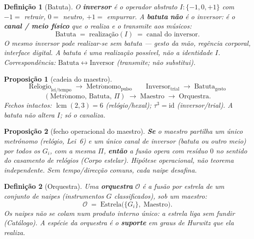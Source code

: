 \documentclass[11pt,a4paper]{article}
\newtheorem{definicao}{Definição}
\newtheorem{proposicao}{Proposição}
\begin{document}
\begin{definicao}[Batuta]\label{def:batuta}
O \textbf{inversor} é o operador abstrato $I\colon\{-1,0,+1\}$ com
$-1=$ retrair, $0=$ neutro, $+1=$ empurrar.
A \textbf{batuta} \textbf{não} é o inversor: é o
\textbf{canal / meio físico} que o realiza e o transmite aos músicos:
\[
\boxed{
\mathrm{Batuta}
\;=\;
\text{realização}(I)
\;=\;
\text{canal do inversor}.
}
\]
O mesmo inversor pode realizar-se sem batuta --- gesto da mão,
regência corporal, interface digital. A batuta é \emph{uma} realização
possível, não a identidade $I$. Correspondência:
$\mathrm{Batuta}\leftrightarrow\mathrm{Inversor}$ (transmite; não
substitui).
\end{definicao}

\begin{proposicao}[cadeia do maestro]\label{prop:batuta-metro}
\[
\boxed{
\mathrm{Rel\acute{o}gio}_{\mathrm{lei/tempo}}
\;\rightarrow\;
\mathrm{Metr\acute{o}nomo}_{\mathrm{pulso}}
}
\qquad
\boxed{
\mathrm{Inversor}_{\mathrm{trial}}
\;\rightarrow\;
\mathrm{Batuta}_{\mathrm{gesto}}
}
\]
\[
\boxed{
(\mathrm{Metr\acute{o}nomo},\,\mathrm{Batuta},\,\Pi)
\;\rightarrow\;
\mathrm{Maestro}
\;\rightarrow\;
\mathrm{Orquestra}.
}
\]
Fechos intactos: $\operatorname{lcm}(2,3)=6$ (relógio/hexal);
$\tau^{3}=\mathrm{id}$ (inversor/trial). A batuta não altera $I$; só o
canaliza.
\end{proposicao}

\begin{proposicao}[fecho operacional do maestro]\label{prop:maestro-fecha}
\textbf{Se} o maestro partilha um único metrónomo (relógio, Lei~6) e um
único canal de inversor (batuta ou outro meio) por todos os $G_i$, com
a mesma $\Pi$, \textbf{então} a fusão opera com resíduo $0$ no sentido
do casamento de relógios (\emph{Corpo estelar}). Hipótese operacional,
não teorema independente. Sem tempo/direcção comuns, cada naipe desafina.
\end{proposicao}

\begin{definicao}[Orquestra]\label{def:orquestra}
Uma \textbf{orquestra} $\mathcal{O}$ é a fusão por estrela de um
conjunto de naipes (instrumentos $G$ classificados), sob um maestro:
\[
\mathcal{O}
\;=\;
\mathrm{Estrela}\bigl(\{G_i\},\;\mathrm{Maestro}\bigr).
\]
Os naipes não se colam num produto interno único: a estrela liga sem
fundir (\emph{Catálogo}). A espécie da orquestra é o \textbf{suporte}
em graus de Hurwitz que ela realiza.
\end{definicao}
\end{document}
